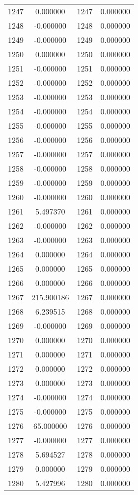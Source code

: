 \documentclass[12pt]{article}
\begin{document}
\begin{longtable}{@{}cccc@{}}
1247 & 0.000000 & 1247 & 0.000000 \\
1248 & -0.000000 & 1248 & 0.000000 \\
1249 & -0.000000 & 1249 & 0.000000 \\
1250 & 0.000000 & 1250 & 0.000000 \\
1251 & -0.000000 & 1251 & 0.000000 \\
1252 & -0.000000 & 1252 & 0.000000 \\
1253 & -0.000000 & 1253 & 0.000000 \\
1254 & -0.000000 & 1254 & 0.000000 \\
1255 & -0.000000 & 1255 & 0.000000 \\
1256 & -0.000000 & 1256 & 0.000000 \\
1257 & -0.000000 & 1257 & 0.000000 \\
1258 & -0.000000 & 1258 & 0.000000 \\
1259 & -0.000000 & 1259 & 0.000000 \\
1260 & -0.000000 & 1260 & 0.000000 \\
1261 & 5.497370 & 1261 & 0.000000 \\
1262 & -0.000000 & 1262 & 0.000000 \\
1263 & -0.000000 & 1263 & 0.000000 \\
1264 & 0.000000 & 1264 & 0.000000 \\
1265 & 0.000000 & 1265 & 0.000000 \\
1266 & 0.000000 & 1266 & 0.000000 \\
1267 & 215.900186 & 1267 & 0.000000 \\
1268 & 6.239515 & 1268 & 0.000000 \\
1269 & -0.000000 & 1269 & 0.000000 \\
1270 & 0.000000 & 1270 & 0.000000 \\
1271 & 0.000000 & 1271 & 0.000000 \\
1272 & 0.000000 & 1272 & 0.000000 \\
1273 & 0.000000 & 1273 & 0.000000 \\
1274 & -0.000000 & 1274 & 0.000000 \\
1275 & -0.000000 & 1275 & 0.000000 \\
1276 & 65.000000 & 1276 & 0.000000 \\
1277 & -0.000000 & 1277 & 0.000000 \\
1278 & 5.694527 & 1278 & 0.000000 \\
1279 & 0.000000 & 1279 & 0.000000 \\
1280 & 5.427996 & 1280 & 0.000000 \\

\end{longtable}
\end{document}
